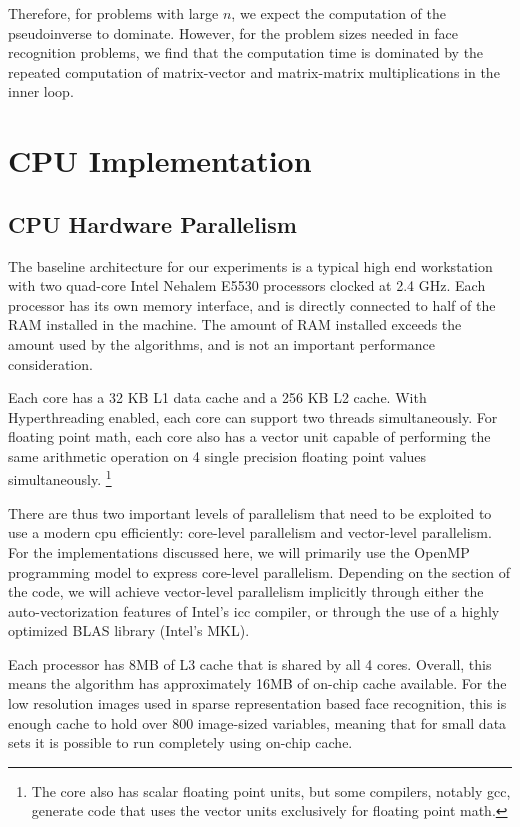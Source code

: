 \documentclass[10pt,twocolumn,letterpaper]{article}
\begin{document}
Therefore, for problems with large $n$, we expect the computation of the pseudoinverse to dominate.  However,
for the problem sizes needed in face recognition problems, we find that the computation time is dominated
by the repeated computation of matrix-vector and matrix-matrix multiplications in the inner loop.

\section{CPU Implementation}
\subsection{CPU Hardware Parallelism}
The baseline architecture for our experiments is 
a typical high end workstation with two quad-core Intel Nehalem E5530 processors clocked at 2.4 GHz.
Each processor has its own memory interface, and is directly connected to half of the
RAM installed in the machine.  The amount of RAM installed exceeds the amount used
by the algorithms, and is not an important performance consideration.  

Each core has a 32 KB L1 data cache and a 256 KB L2 cache. With Hyperthreading enabled, each core can
support two threads simultaneously.  For floating point math, each core also has a vector unit capable of
performing the same arithmetic operation on 4 single precision floating point values simultaneously.
\footnote{The core also has scalar floating point units, but some compilers, notably gcc, generate
code that uses the vector units exclusively for floating point math.} 

There are thus two important levels of parallelism that need to be exploited to use
a modern cpu efficiently: core-level parallelism and vector-level parallelism.
For the implementations discussed here, we will primarily use the OpenMP programming model 
to express core-level parallelism.  Depending on the section of the code, we will achieve vector-level parallelism 
implicitly through either the auto-vectorization features of Intel's icc compiler, 
or through the use of a highly optimized BLAS library (Intel's MKL).

Each processor has 8MB of L3 cache that is shared by all 4 cores.
Overall, this means the algorithm has approximately 16MB of on-chip cache available.  
For the low resolution images used in sparse representation based face recognition,
this is enough cache to hold over 800 image-sized variables, meaning that for small data sets
it is possible to run completely using on-chip cache.
\end{document}
